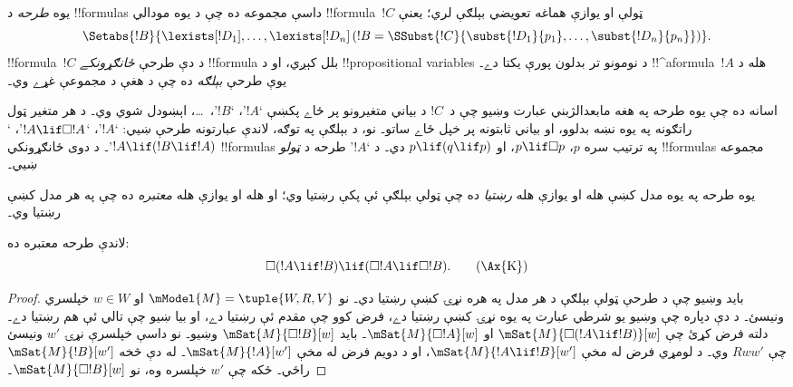 \documentclass[../../../include/open-logic-section]{subfiles}
\begin{document}


\begin{defn}
  يوه \emph{طرحه} د !!{formula}s داسې مجموعه ده چې د يوه مودالي
  !!{formula}~$!C$ ټولې او يوازې هماغه تعويضي بېلګې لري؛ يعنې
  \[
  \Setabs{!B}{\lexists[!D_1], \dots, \lexists[!D_n] \left(!B =
  \SSubst{!C}{\subst{!D_1}{p_1}, \dots, \subst{!D_n}{p_n}} \right) }.
  \]
  !!{formula}~$!C$ د دې طرحې \emph{ځانګړونکے} !!{formula} بلل کېږي،
  او د !!{propositional
  variable}s د نومونو تر بدلون پورې يکتا دے۔
  !!^a{formula}~$!A$ هله د يوې طرحې \emph{بېلګه} ده چې د هغې د
  مجموعې غړے وي۔
\end{defn}

اسانه ده چې يوه طرحه په هغه مابعدالژبني عبارت وښيو چې د~$!C$ د
بياني متغيرونو پر ځاے پکښې `$!A$'، `$!B$'،~\dots، اېښودل شوي وي۔ د هر متغير ټول راتګونه په يوه نښه بدلوو، او بياني
ثابتونه پر خپل ځاے ساتو۔
نو، د بېلګې په توګه، لاندې عبارتونه طرحې ښيي:
`$!A$'، `$!A \lif \Box!A$'، `$!A \lif (!B \lif !A)$'۔ د دوى
ځانګړونکي !!{formula}s په ترتيب سره $p$، $p \lif \Box p$،
او $p \lif (q \lif p)$ دي۔ د `$!A$' طرحه د \emph{ټولو}
!!{formula}s مجموعه ښيي۔

\begin{defn}
  يوه طرحه په يوه مدل کښې هله او يوازې هله \emph{رښتيا} ده چې ټولې
  بېلګې ئې پکې رښتيا وي؛ او هله او يوازې هله \emph{معتبره} ده چې په
  هر مدل کښې رښتيا وي۔
\end{defn}

\begin{prop}
  لاندې  طرحه معتبره ده:
  \begin{equation*}
  \Box(!A \lif !B) \lif (\Box !A \lif \Box !B). \tag{\Ax{K}}
  \end{equation*}
\end{prop}

\begin{proof}
  بايد وښيو چې د طرحې ټولې بېلګې د هر مدل په هره نړۍ کښې رښتيا دي۔
  نو $\mModel{M} = \tuple{W,R,V}$ او $w \in W$ خپلسري ونيسئ۔ د دې
  دپاره چې وښيو يو شرطي عبارت په يوه نړۍ کښې رښتيا دے، فرض کوو چې
  مقدم ئې رښتيا دے، او بيا ښيو چې تالي ئې هم رښتيا دے۔ دلته فرض کړئ
  چې $\mSat{M}{\Box(!A \lif !B)}[w]$ او $\mSat{M}{\Box !A}[w]$۔
  بايد $\mSat{M}{\Box !B}[w]$ وښيو۔ نو داسې خپلسرې نړۍ $w'$ ونيسئ
  چې $Rww'$ وي۔ د لومړي فرض له مخې $\mSat{M}{!A \lif !B}[w']$، او
  د دويم فرض له مخې $\mSat{M}{!A}[w']$۔ له دې څخه
  $\mSat{M}{!B}[w']$ راځي۔ ځکه چې $w'$ خپلسره وه، نو
  $\mSat{M}{\Box !B}[w]$۔
\end{proof}
\end{document}
